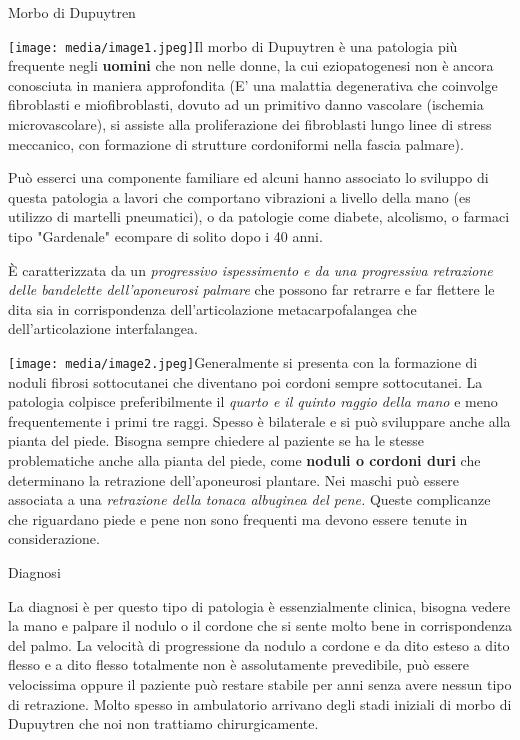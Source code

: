\documentclass[]{article}
\date{}
\begin{document}
Morbo di Dupuytren

\texttt{[image: media/image1.jpeg]}Il
morbo di Dupuytren è una patologia più frequente negli \textbf{uomini}
che non nelle donne, la cui eziopatogenesi non è ancora conosciuta in
maniera approfondita (E' una malattia degenerativa che coinvolge
fibroblasti e miofibroblasti, dovuto ad un primitivo danno vascolare
(ischemia microvascolare), si assiste alla proliferazione dei
fibroblasti lungo linee di stress meccanico, con formazione di strutture
cordoniformi nella fascia palmare).

Può esserci una componente familiare ed alcuni hanno associato lo
sviluppo di questa patologia a lavori che comportano vibrazioni a
livello della mano (es utilizzo di martelli pneumatici), o da patologie
come diabete, alcolismo, o farmaci tipo "Gardenale" ecompare di solito
dopo i 40 anni.

È caratterizzata da un \emph{progressivo ispessimento e da una
progressiva retrazione delle bandelette dell'aponeurosi palmare} che
possono far retrarre e far flettere le dita sia in corrispondenza
dell'articolazione metacarpofalangea che dell'articolazione
interfalangea.

\texttt{[image: media/image2.jpeg]}Generalmente
si presenta con la formazione di noduli fibrosi sottocutanei che
diventano poi cordoni sempre sottocutanei. La patologia colpisce
preferibilmente il \emph{quarto e il quinto raggio della mano} e meno
frequentemente i primi tre raggi. Spesso è bilaterale e si può
sviluppare anche alla pianta del piede. Bisogna sempre chiedere al
paziente se ha le stesse problematiche anche alla pianta del piede, come
\textbf{noduli o cordoni duri} che determinano la retrazione
dell'aponeurosi plantare. Nei maschi può essere associata a una
\emph{retrazione della tonaca albuginea del pene.} Queste complicanze
che riguardano piede e pene non sono frequenti ma devono essere tenute
in considerazione.

Diagnosi

La diagnosi è per questo tipo di patologia è essenzialmente clinica,
bisogna vedere la mano e palpare il nodulo o il cordone che si sente
molto bene in corrispondenza del palmo. La velocità di progressione da
nodulo a cordone e da dito esteso a dito flesso e a dito flesso
totalmente non è assolutamente prevedibile, può essere velocissima
oppure il paziente può restare stabile per anni senza avere nessun tipo
di retrazione. Molto spesso in ambulatorio arrivano degli stadi iniziali
di morbo di Dupuytren che noi non trattiamo chirurgicamente.
\end{document}
